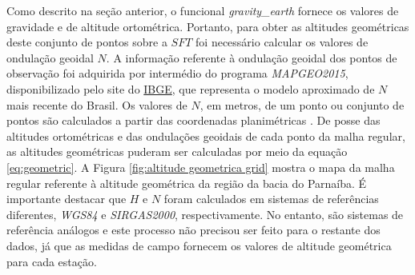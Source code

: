 Como descrito na seção anterior, o funcional \textit{gravity\_earth} fornece os valores de gravidade e de altitude ortométrica. Portanto, para obter as altitudes geométricas deste conjunto de pontos sobre a $SFT$ foi necessário calcular os valores de ondulação geoidal $N$. A informação referente à ondulação geoidal dos pontos de observação foi adquirida por intermédio do programa \textit{MAPGEO2015}, disponibilizado pelo site do \href{https://www.ibge.gov.br/geociencias/modelos-digitais-de-superficie/modelos-digitais-de-superficie/10855-modelo-de-ondulacao-geoidal.html?=&t=o-que-e}{IBGE}, que representa o modelo aproximado de $N$ mais recente do Brasil. Os valores de $N$, em metros, de um ponto ou conjunto
de pontos são calculados a partir das coordenadas planimétricas \cite{mapgeo2015}. De posse das altitudes ortométricas e das ondulações geoidais de cada ponto da malha regular, as altitudes geométricas puderam ser calculadas por meio da equação \ref{eq:geometric}. A Figura \ref{fig:altitude geometrica grid} mostra o mapa da malha regular referente à altitude geométrica da região da bacia do Parnaíba. É importante destacar que $H$ e $N$ foram calculados em sistemas de referências diferentes, \textit{WGS84} e \textit{SIRGAS2000}, respectivamente. No entanto, são sistemas de referência análogos e este processo não precisou ser feito para o restante dos dados, já que as medidas de campo fornecem os valores de altitude geométrica para cada estação.

